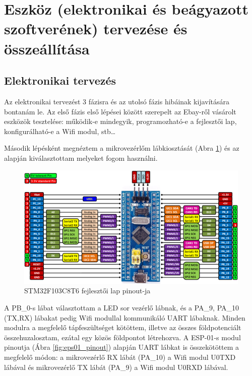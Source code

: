 \documentclass[../main.tex]{subfiles}
\begin{document}
\section{Eszköz (elektronikai és beágyazott szoftverének) tervezése és összeállítása}
    \subsection{Elektronikai tervezés}
        Az elektronikai tervezést 3 fázisra és az utolsó fázis hibáinak kijavítására bontanám le. Az első fázis első lépései között szerepelt az Ebay-ről vásárolt eszközök tesztelése: működik-e mindegyik, programozható-e a fejlesztői lap, konfigurálható-e a Wifi modul, stb\ldots
        
        Második lépésként megnéztem a mikrovezérlőm lábkiosztását (Abra \ref{fig:stm32f103_pinout}) és az alapján kiválasztottam melyeket fogom használni. 
        
        \begin{figure}[h!]
            \centering
            \includegraphics[width=14cm]{resources/pcb_res/stm32f103c8t6_pinout.png}
            \caption{STM32F103C8T6 fejlesztői lap pinout-ja}
            \label{fig:stm32f103_pinout}
        \end{figure}
        
        A PB\_0-s lábat választottam a LED sor vezérlő lábnak, és a PA\_9, PA\_10 (TX,RX) lábakat pedig Wifi modullal kommunikáló UART lábaknak. Minden modulra a megfelelő tápfeszültséget kötöttem, illetve az összes földpotenciált összehuzalosztam, ezátal egy közös földpontot létrehozva. A ESP-01-s modul pinoutja (Ábra \ref{fig:eps01_pinout}) alapján UART lábkat is összekötöttem a megfelelő módon: a mikrovezérlő RX lábát (PA\_10) a Wifi modul U0TXD lábával és mikrovezérlő TX lábát (PA\_9) a Wifi modul U0RXD lábával. 
        
\end{document}
